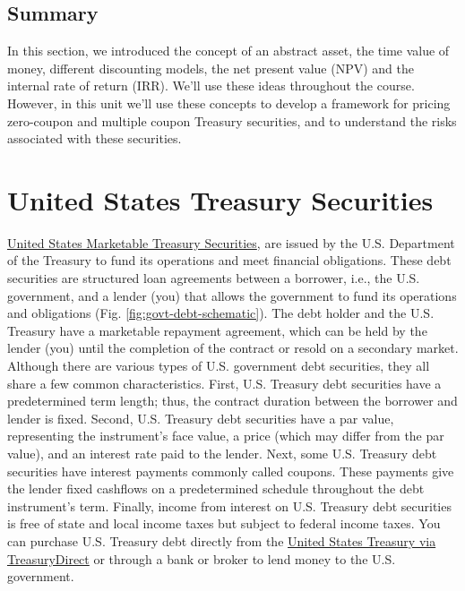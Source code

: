 \documentclass[11pt]{article}
\theoremstyle{definition}
\begin{document}
\subsection{Summary}
In this section, we introduced the concept of an abstract asset, the time value of money, different discounting models, the net present value (NPV) and the internal rate of return (IRR).
We'll use these ideas throughout the course. However, in this unit we'll use these concepts to develop a framework for pricing zero-coupon and multiple coupon Treasury securities, 
and to understand the risks associated with these securities.

\section{United States Treasury Securities}
\href{https://www.investor.gov/introduction-investing/investing-basics/glossary/treasury-securities}{United States Marketable Treasury Securities}, 
are issued by the U.S. Department of the Treasury to fund its operations and meet financial obligations. 
These debt securities are structured loan agreements between a borrower, i.e., the U.S. government, and a lender (you) 
that allows the government to fund its operations and obligations (Fig. \ref{fig:govt-debt-schematic}).
The debt holder and the U.S. Treasury have a marketable repayment agreement, which can be held by the lender (you) until the completion of the contract or resold on a secondary market. Although there are various types of U.S. government debt securities, they all share a few common characteristics. 
First, U.S. Treasury debt securities have a predetermined term length; thus, the contract duration between the borrower and lender is fixed.
Second, U.S. Treasury debt securities have a par value, representing the instrument's face value, a price (which may differ from the par value), and an interest rate paid to the lender. Next, some U.S. Treasury debt securities have interest payments commonly called coupons. These payments give the lender fixed cashflows on a predetermined schedule throughout the debt instrument's term. Finally, income from interest on U.S. Treasury debt securities is free of state and local income taxes but subject to federal income taxes.
You can purchase U.S. Treasury debt directly from the \href{https://www.treasurydirect.gov/indiv/products/prod_tbonds_glance.htm}{United States Treasury via TreasuryDirect} 
or through a bank or broker to lend money to the U.S. government.
\end{document}
